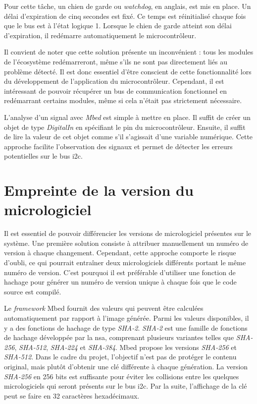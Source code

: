 Pour cette tâche, un chien de garde ou \textit{watchdog}, en anglais, est mis en place.
Un délai d'expiration de cinq secondes est fixé.
Ce temps est réinitialisé chaque fois que le bus est à l'état logique 1.
Lorsque le chien de garde atteint son délai d'expiration, il redémarre automatiquement le microcontrôleur.

Il convient de noter que cette solution présente un inconvénient : tous les modules de l'écosystème redémarreront, même s'ils ne sont pas directement liés au problème détecté.
Il est donc essentiel d'être conscient de cette fonctionnalité lors du développement de l'application du microcontrôleur.
Cependant, il est intéressant de pouvoir récupérer un bus de communication fonctionnel en redémarrant certains modules, même si cela n'était pas strictement nécessaire.

L'analyse d'un signal avec \textit{Mbed} est simple à mettre en place.
Il suffit de créer un objet de type \textit{DigitalIn} en spécifiant le pin du microcontrôleur.
Ensuite, il suffit de lire la valeur de cet objet comme s'il s'agissait d'une variable numérique.
Cette approche facilite l'observation des signaux et permet de détecter les erreurs potentielles sur le bus \gls{i2c}.

\section{Empreinte de la version du micrologiciel}

Il est essentiel de pouvoir différencier les versions de micrologiciel présentes sur le système.
Une première solution consiste à attribuer manuellement un numéro de version à chaque changement.
Cependant, cette approche comporte le risque d'oubli, ce qui pourrait entraîner deux micrologiciels différents portant le même numéro de version.
C'est pourquoi il est préférable d'utiliser une fonction de hachage pour générer un numéro de version unique à chaque fois que le code source est compilé.

Le \textit{\gls{framework}} Mbed fournit des valeurs qui peuvent être calculées automatiquement par rapport à l'image générée.
Parmi les valeurs disponibles, il y a des fonctions de hachage de type \textit{SHA-2}. \textit{SHA-2} est une famille de fonctions de hachage développée par la \gls{nsa}, comprenant plusieurs variantes telles que \textit{SHA-256}, \textit{SHA-512}, \textit{SHA-224} et \textit{SHA-384}.
Mbed propose les versions \textit{SHA-256} et \textit{SHA-512}.
Dans le cadre du projet, l'objectif n'est pas de protéger le contenu original, mais plutôt d'obtenir une clé différente à chaque génération.
La version \textit{SHA-256} en 256 bits est suffisante pour éviter les collisions entre les quelques micrologiciels qui seront présents sur le bus \gls{i2c}.
Par la suite, l'affichage de la clé peut se faire en 32 caractères hexadécimaux.

